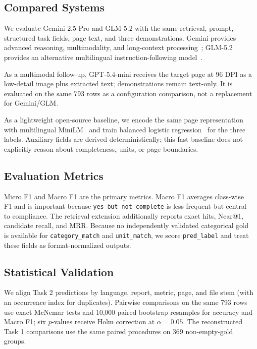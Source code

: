 \documentclass[sigconf,article]{acmart}
\newcommand{\openSource}{open\allowbreak-source}
\begin{document}
\subsection{Compared Systems}
We evaluate Gemini 2.5 Pro and GLM-5.2 with the same retrieval, prompt, structured task fields, page text, and three demonstrations. Gemini provides advanced reasoning, multimodality, and long-context processing~\cite{gemini2025gemini25}; GLM-5.2 provides an alternative multilingual instruction-following model~\cite{zeng2024chatglm}.

As a multimodal follow-up, GPT-5.4-mini receives the target page at 96 DPI as a low-detail image plus extracted text; demonstrations remain text-only. It is evaluated on the same 793 rows as a configuration comparison, not a replacement for Gemini/GLM.

As a lightweight \openSource{} baseline, we encode the same page representation with multilingual MiniLM~\cite{wang2020minilm,reimers2019sentencebert,reimers2020multilingual} and train balanced logistic regression~\cite{pedregosa2011scikit} for the three labels. Auxiliary fields are derived deterministically; this fast baseline does not explicitly reason about completeness, units, or page boundaries.

\subsection{Evaluation Metrics}
Micro F1 and Macro F1 are the primary metrics. Macro F1 averages class-wise F1 and is important because \texttt{yes but not complete} is less frequent but central to compliance. The retrieval extension additionally reports exact hits, Near@1, candidate recall, and MRR. Because no independently validated categorical gold is available for \texttt{category\_match} and \texttt{unit\_match}, we score \texttt{pred\_label} and treat these fields as format-normalized outputs.

\subsection{Statistical Validation}
We align Task 2 predictions by language, report, metric, page, and file stem (with an occurrence index for duplicates). Pairwise comparisons on the same 793 rows use exact McNemar tests and 10,000 paired bootstrap resamples for accuracy and Macro F1; six $p$-values receive Holm correction at $\alpha=0.05$. The reconstructed Task 1 comparisons use the same paired procedures on 369 non-empty-gold groups.
\end{document}
